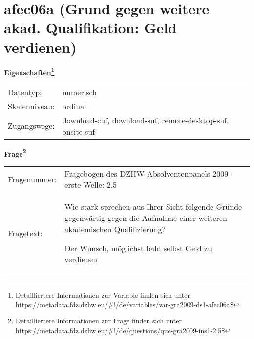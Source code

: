 
    \setcounter{footnote}{0}

    \vspace*{-1.8cm}
	\section{afec06a (Grund gegen weitere akad. Qualifikation: Geld verdienen)}
	\label{section:afec06a}



    \vspace*{0.5cm}
    \noindent\textbf{Eigenschaften\footnote{Detailliertere Informationen zur Variable finden sich unter
		\url{https://metadata.fdz.dzhw.eu/\#!/de/variables/var-gra2009-ds1-afec06a$}}}\\
	\begin{tabularx}{\hsize}{@{}lX}
	Datentyp: & numerisch \\
	Skalenniveau: & ordinal \\
	Zugangswege: &
	  download-cuf, 
	  download-suf, 
	  remote-desktop-suf, 
	  onsite-suf
 \\
    \end{tabularx}



				\vspace*{0.5cm}
                \noindent\textbf{Frage\footnote{Detailliertere Informationen zur Frage finden sich unter
		              \url{https://metadata.fdz.dzhw.eu/\#!/de/questions/que-gra2009-ins1-2.5$}}}\\
				\begin{tabularx}{\hsize}{@{}lX}
					Fragenummer: &
					  Fragebogen des DZHW-Absolventenpanels 2009 - erste Welle:
					  2.5
 \\
					Fragetext: & Wie stark sprechen aus Ihrer Sicht folgende Gründe gegenwärtig gegen die Aufnahme einer weiteren akademischen Qualifizierung?\par  Der Wunsch, möglichst bald selbst Geld zu verdienen \\
				\end{tabularx}





